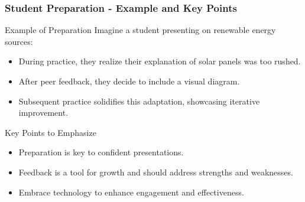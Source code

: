 \documentclass[aspectratio=169]{beamer}
\begin{document}
\begin{frame}[fragile]
    \frametitle{Student Preparation - Example and Key Points}
    \begin{block}{Example of Preparation}
        Imagine a student presenting on renewable energy sources:
        \begin{itemize}
            \item During practice, they realize their explanation of solar panels was too rushed.
            \item After peer feedback, they decide to include a visual diagram.
            \item Subsequent practice solidifies this adaptation, showcasing iterative improvement.
        \end{itemize}
    \end{block}
    
    \begin{block}{Key Points to Emphasize}
        \begin{itemize}
            \item Preparation is key to confident presentations.
            \item Feedback is a tool for growth and should address strengths and weaknesses.
            \item Embrace technology to enhance engagement and effectiveness.
        \end{itemize}
    \end{block}
\end{frame}
\end{document}
